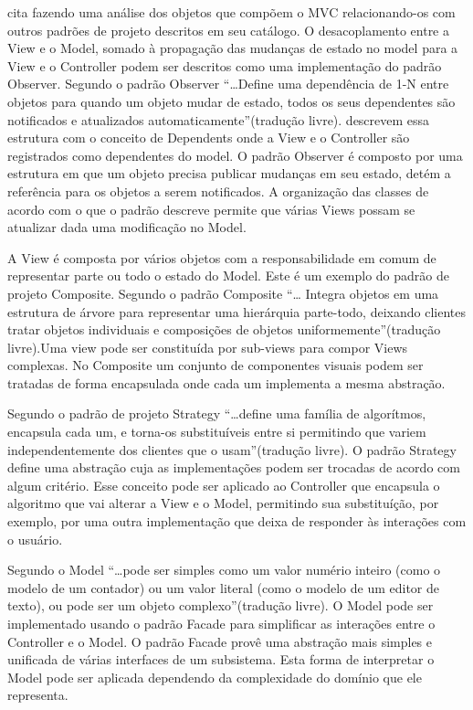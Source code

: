  cita  fazendo uma análise dos
objetos que compõem o MVC relacionando-os com outros padrões de projeto
descritos em seu catálogo.
O desacoplamento entre a View e o Model, somado à propagação das mudanças de
estado no model para a View e o Controller podem ser
descritos como uma implementação do padrão Observer. Segundo \cite{gof} o padrão
Observer ``\ldots Define uma dependência de 1-N entre objetos para quando um
objeto mudar de estado, todos os seus dependentes são notificados e atualizados
automaticamente''(tradução livre).  descrevem essa
estrutura com o conceito de Dependents onde a View e o Controller são
registrados como dependentes do model. O padrão Observer é composto por uma
estrutura em que um objeto precisa publicar mudanças em seu estado, detém a
referência para os objetos a serem notificados. A organização das classes de
acordo com o que o padrão descreve permite que várias Views possam se atualizar
dada uma modificação no Model.

A View é composta por vários objetos com a responsabilidade em comum de
representar parte ou todo o estado do Model. Este é um exemplo do padrão de
projeto Composite. Segundo  o padrão Composite ``\ldots
Integra objetos em uma estrutura de árvore para representar uma hierárquia
parte-todo, deixando clientes tratar objetos individuais e composições de
objetos uniformemente''(tradução livre).Uma view pode ser constituída por
sub-views para compor Views complexas. No Composite  um conjunto de componentes
visuais podem ser tratadas de forma encapsulada onde cada um implementa a
mesma abstração. 

Segundo  o padrão de projeto Strategy ``\ldots define uma
família de algorítmos, encapsula cada um, e torna-os substituíveis entre si
permitindo que variem independentemente dos clientes que o usam''(tradução
livre). O padrão Strategy define uma abstração cuja as implementações podem ser
trocadas de acordo com algum critério. Esse conceito pode ser aplicado ao
Controller que encapsula o algoritmo que vai alterar a View e o Model,
permitindo sua substituíção, por exemplo, por uma outra implementação que deixa
de responder às interações com o usuário.

Segundo  o Model ``\ldots pode ser simples como
um valor numério inteiro (como o modelo de um contador) ou um valor literal
(como o modelo de um editor de texto), ou pode ser um objeto complexo''(tradução
livre). O Model pode ser implementado usando o padrão Facade para simplificar
as interações entre o Controller e o Model. O padrão Facade provê
uma abstração mais simples e unificada de várias interfaces de um
subsistema\cite{gof}. Esta forma de interpretar o Model pode ser aplicada
dependendo da complexidade do domínio que ele representa.

